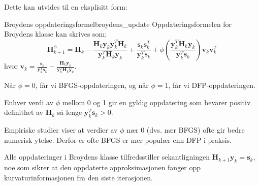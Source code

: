 Dette kan utvides til en eksplisitt form:

\begin{proposition}{Broydens oppdateringsformel}{broydens_update}
	Oppdateringsformelen for Broydens klasse kan skrives som:
	\[
		\symbf{H}_{k+1}^\phi = \symbf{H}_k - \frac{\symbf{H}_k\symbf{y}_k\symbf{y}_k^T\symbf{H}_k}{\symbf{y}_k^T\symbf{H}_k\symbf{y}_k} + \frac{\symbf{s}_k\symbf{s}_k^T}{\symbf{y}_k^T\symbf{s}_k} + \phi\left(\frac{\symbf{y}_k^T\symbf{H}_k\symbf{y}_k}{\symbf{y}_k^T\symbf{s}_k}\right)\symbf{v}_k\symbf{v}_k^T
	\]
	hvor $\symbf{v}_k = \frac{\symbf{s}_k}{\symbf{y}_k^T\symbf{s}_k} - \frac{\symbf{H}_k\symbf{y}_k}{\symbf{y}_k^T\symbf{H}_k\symbf{y}_k}$.

	Når $\phi = 0$, får vi BFGS-oppdateringen, og når $\phi = 1$, får vi DFP-oppdateringen.

	Enhver verdi av $\phi$ mellom 0 og 1 gir en gyldig oppdatering som bevarer positiv definithet av $\symbf{H}_k$ så lenge $\symbf{y}_k^T\symbf{s}_k > 0$.
\end{proposition}

\begin{remark}{}{}
	Empiriske studier viser at verdier av $\phi$ nær 0 (dvs. nær BFGS) ofte gir bedre numerisk ytelse\cite{NocedalWright2006}.
	Derfor er ofte BFGS er mer populær enn DFP i praksis.
\end{remark}

Alle oppdateringer i Broydens klasse tilfredsstiller sekantligningen $\symbf{H}_{k+1}\symbf{y}_k = \symbf{s}_k$, noe som sikrer at den oppdaterte approksimasjonen fanger opp kurvaturinformasjonen fra den siste iterasjonen.

